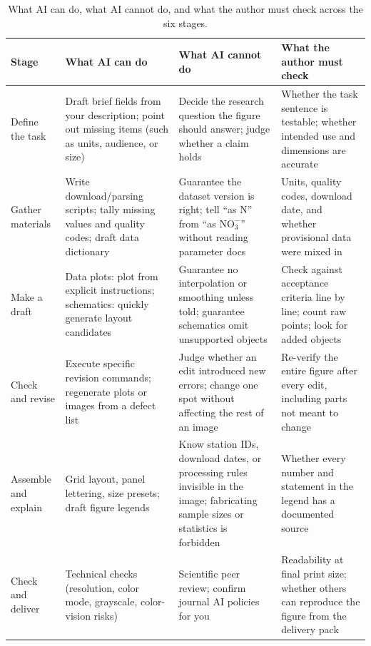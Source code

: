 \begin{table}[htbp]\centering\footnotesize
\setlength{\tabcolsep}{3pt}
\renewcommand{\arraystretch}{1.15}
\caption{What AI can do, what AI cannot do, and what the author must check across the six stages.}\label{tab:ch01-01}
\begin{tabularx}{\linewidth}{@{}>{\raggedright\arraybackslash}p{20mm}YYY@{}}
\toprule
\textbf{Stage} & \textbf{What AI can do} & \textbf{What AI cannot do} & \textbf{What the author must check} \\
\midrule
Define the task & Draft brief fields from your description; point out missing items (such as units, audience, or size) & Decide the research question the figure should answer; judge whether a claim holds & Whether the task sentence is testable; whether intended use and dimensions are accurate \\
Gather materials & Write download/parsing scripts; tally missing values and quality codes; draft data dictionary & Guarantee the dataset version is right; tell ``as N'' from ``as $\text{NO}_3^-$'' without reading parameter docs & Units, quality codes, download date, and whether provisional data were mixed in \\
Make a draft & Data plots: plot from explicit instructions; schematics: quickly generate layout candidates & Guarantee no interpolation or smoothing unless told; guarantee schematics omit unsupported objects & Check against acceptance criteria line by line; count raw points; look for added objects \\
Check and revise & Execute specific revision commands; regenerate plots or images from a defect list & Judge whether an edit introduced new errors; change one spot without affecting the rest of an image & Re-verify the entire figure after every edit, including parts not meant to change \\
Assemble and explain & Grid layout, panel lettering, size presets; draft figure legends & Know station IDs, download dates, or processing rules invisible in the image; fabricating sample sizes or statistics is forbidden & Whether every number and statement in the legend has a documented source \\
Check and deliver & Technical checks (resolution, color mode, grayscale, color-vision risks) & Scientific peer review; confirm journal AI policies for you & Readability at final print size; whether others can reproduce the figure from the delivery pack \\
\bottomrule
\end{tabularx}
\end{table}

